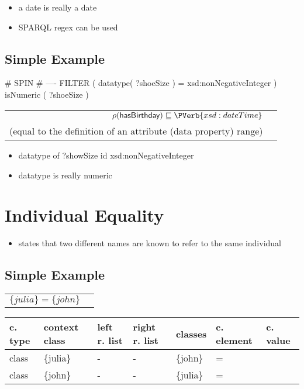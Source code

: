\documentclass{llncs}
\newenvironment{gcotable}{
  \scriptsize
  \sffamily
  \vspace{0.3cm}
	\begin{center}
  \begin{tabular}{l|l|l|l|l|l|l}
  \hline
  \textbf{c. type} & \textbf{context class} & \textbf{left r. list} & \textbf{right r. list} & \textbf{classes} & \textbf{c. element} & \textbf{c. value} \\
  \hline

}{
  \hline
  \end{tabular}
	\end{center}
}
\newenvironment{DL}{
	\begin{center}
  \begin{tabular}{r l}

}{
  \end{tabular}
	\end{center}
}
\begin{document}
\begin{itemize}
	\item a date is really a date
  \item SPARQL regex can be used
\end{itemize}

\subsection{Simple Example}

\begin{ex}
# SPIN
# ----
FILTER ( datatype( ?shoeSize ) = xsd:nonNegativeInteger )
isNumeric ( ?shoeSize )
\end{ex}

\begin{DL} 
$\rho(\textsf{hasBirthday}) \sqsubseteq \PVerb{xsd:dateTime}$\\
(equal to the definition of an attribute (data property) range)
\end{DL}

\begin{itemize}
	\item datatype of ?showSize id xsd:nonNegativeInteger
	\item datatype is really numeric
\end{itemize}

\section{Individual Equality}



\begin{itemize}
	\item states that two different names are known to refer to the same individual \cite{Kroetzsch2012}
\end{itemize}

\subsection{Simple Example}

\begin{DL}
$\{julia\} = \{john\} $\\
\end{DL}

\begin{gcotable}
class & \{julia\} & - & - & \{john\} & = \\
class & \{john\} & - & - & \{julia\} & = \\
\end{gcotable}
\end{document}
